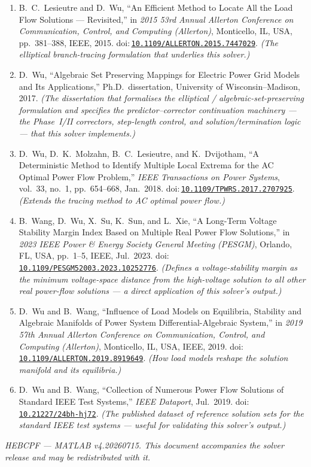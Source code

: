 \documentclass[11pt,a4paper]{article}
\newcommand{\doi}[1]{\href{https://doi.org/#1}{\nolinkurl{#1}}}
\begin{document}
\begin{enumerate}[leftmargin=1.6em]
\item B.\ C.\ Lesieutre and D.\ Wu, ``An Efficient Method to Locate All the Load Flow
      Solutions --- Revisited,'' in \emph{2015 53rd Annual Allerton Conference on
      Communication, Control, and Computing (Allerton)}, Monticello, IL, USA, pp.~381--388,
      IEEE, 2015. doi:\,\doi{10.1109/ALLERTON.2015.7447029}. \emph{(The elliptical
      branch-tracing formulation that underlies this solver.)}
\item D.\ Wu, ``Algebraic Set Preserving Mappings for Electric Power Grid Models and Its
      Applications,'' Ph.D.\ dissertation, University of Wisconsin--Madison, 2017.
      \emph{(The dissertation that formalises the elliptical / algebraic-set-preserving
      formulation and specifies the predictor--corrector continuation machinery --- the
      Phase~I/II correctors, step-length control, and solution/termination logic --- that
      this solver implements.)}
\item D.\ Wu, D.\ K.\ Molzahn, B.\ C.\ Lesieutre, and K.\ Dvijotham, ``A Deterministic
      Method to Identify Multiple Local Extrema for the AC Optimal Power Flow Problem,''
      \emph{IEEE Transactions on Power Systems}, vol.~33, no.~1, pp.~654--668, Jan.\ 2018.
      doi:\,\doi{10.1109/TPWRS.2017.2707925}.
      \emph{(Extends the tracing method to AC optimal power flow.)}
\item B.\ Wang, D.\ Wu, X.\ Su, K.\ Sun, and L.\ Xie, ``A Long-Term Voltage Stability
      Margin Index Based on Multiple Real Power Flow Solutions,'' in \emph{2023 IEEE Power
      \& Energy Society General Meeting (PESGM)}, Orlando, FL, USA, pp.~1--5, IEEE,
      Jul.\ 2023. doi:\,\doi{10.1109/PESGM52003.2023.10252776}.
      \emph{(Defines a voltage-stability margin as the
      minimum voltage-space distance from the high-voltage solution to all other real
      power-flow solutions --- a direct application of this solver's output.)}
\item D.\ Wu and B.\ Wang, ``Influence of Load Models on Equilibria, Stability and
      Algebraic Manifolds of Power System Differential-Algebraic System,'' in \emph{2019
      57th Annual Allerton Conference on Communication, Control, and Computing
      (Allerton)}, Monticello, IL, USA, IEEE, 2019.
      doi:\,\doi{10.1109/ALLERTON.2019.8919649}. \emph{(How load models reshape the
      solution manifold and its equilibria.)}
\item D.\ Wu and B.\ Wang, ``Collection of Numerous Power Flow Solutions of Standard IEEE
      Test Systems,'' \emph{IEEE Dataport}, Jul.\ 2019.
      doi:\,\doi{10.21227/24bh-hj72}. \emph{(The published dataset of reference solution
      sets for the standard IEEE test systems --- useful for validating this solver's
      output.)}
\end{enumerate}

\vfill
\begin{center}\small\itshape
HEBCPF --- MATLAB v4.20260715. This document accompanies the solver release and may be
redistributed with it.
\end{center}
\end{document}
